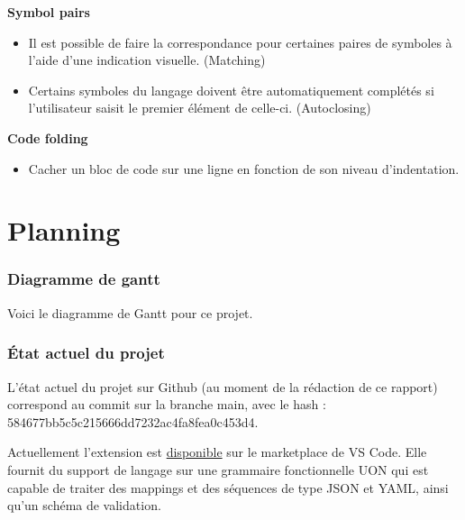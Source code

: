 \documentclass[
    iict, %
    il, %
]{heig-tb}
\begin{document}
\textbf{Symbol pairs}
\begin{itemize}
    \item Il est possible de faire la correspondance pour certaines paires de symboles à l'aide d'une indication visuelle. (Matching)
    \item Certains symboles du langage doivent être automatiquement complétés si l'utilisateur saisit le premier élément de celle-ci. (Autoclosing)
\end{itemize}

\textbf{Code folding}
\begin{itemize}
    \item Cacher un bloc de code sur une ligne en fonction de son niveau d'indentation.
\end{itemize}


\chapter{Planning}


\subsection{Diagramme de gantt}
Voici le diagramme de Gantt pour ce projet.



\subsection{État actuel du projet}

L'état actuel du projet sur Github (au moment de la rédaction de ce rapport) correspond au commit sur la branche main, avec le hash : 584677bb5c5c215666dd7232ac4fa8fea0c453d4.

Actuellement l'extension est \href{https://marketplace.visualstudio.com/items?itemName=vitorva.vscode-uon}{disponible} sur le marketplace de VS Code.
Elle fournit du support de langage sur une grammaire fonctionnelle UON qui est capable de traiter des mappings et des séquences de type JSON et YAML, ainsi qu'un schéma de validation.
\end{document}
